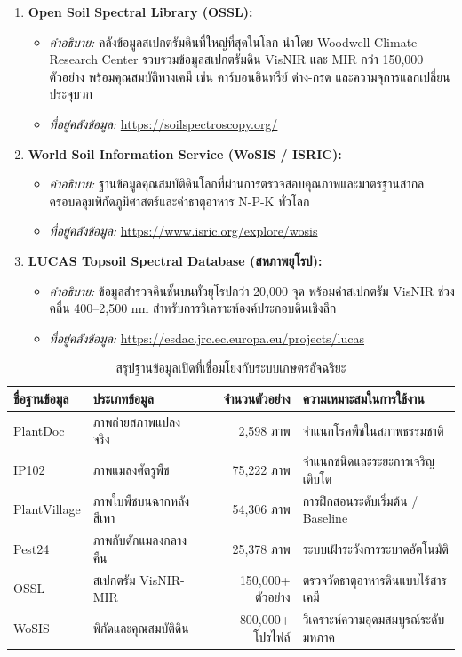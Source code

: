 \label{sec:soil_open_repos}

\begin{enumerate}
    \item \textbf{Open Soil Spectral Library (OSSL):}
    \begin{itemize}
        \item \textit{คำอธิบาย:} คลังข้อมูลสเปกตรัมดินที่ใหญ่ที่สุดในโลก นำโดย Woodwell Climate Research Center รวบรวมข้อมูลสเปกตรัมดิน VisNIR และ MIR กว่า 150,000 ตัวอย่าง พร้อมคุณสมบัติทางเคมี เช่น คาร์บอนอินทรีย์ ด่าง-กรด และความจุการแลกเปลี่ยนประจุบวก
        \item \textit{ที่อยู่คลังข้อมูล:} \url{https://soilspectroscopy.org/}
    \end{itemize}

    \item \textbf{World Soil Information Service (WoSIS / ISRIC):}
    \begin{itemize}
        \item \textit{คำอธิบาย:} ฐานข้อมูลคุณสมบัติดินโลกที่ผ่านการตรวจสอบคุณภาพและมาตรฐานสากล ครอบคลุมพิกัดภูมิศาสตร์และค่าธาตุอาหาร N-P-K ทั่วโลก
        \item \textit{ที่อยู่คลังข้อมูล:} \url{https://www.isric.org/explore/wosis}
    \end{itemize}

    \item \textbf{LUCAS Topsoil Spectral Database (สหภาพยุโรป):}
    \begin{itemize}
        \item \textit{คำอธิบาย:} ข้อมูลสำรวจดินชั้นบนทั่วยุโรปกว่า 20,000 จุด พร้อมค่าสเปกตรัม VisNIR ช่วงคลื่น 400--2,500 nm สำหรับการวิเคราะห์องค์ประกอบดินเชิงลึก
        \item \textit{ที่อยู่คลังข้อมูล:} \url{https://esdac.jrc.ec.europa.eu/projects/lucas}
    \end{itemize}
\end{enumerate}

\begin{table}[htbp]
\centering
\caption{สรุปฐานข้อมูลเปิดที่เชื่อมโยงกับระบบเกษตรอัจฉริยะ}
\label{tab:open_datasets_summary}
\begin{tabular}{llrl}
\toprule
\textbf{ชื่อฐานข้อมูล} & \textbf{ประเภทข้อมูล} & \textbf{จำนวนตัวอย่าง} & \textbf{ความเหมาะสมในการใช้งาน} \\
\midrule
PlantDoc    & ภาพถ่ายสภาพแปลงจริง & 2,598 ภาพ   & จำแนกโรคพืชในสภาพธรรมชาติ \\
IP102       & ภาพแมลงศัตรูพืช     & 75,222 ภาพ  & จำแนกชนิดและระยะการเจริญเติบโต \\
PlantVillage & ภาพใบพืชบนฉากหลังสีเทา & 54,306 ภาพ & การฝึกสอนระดับเริ่มต้น / Baseline \\
Pest24      & ภาพกับดักแมลงกลางคืน & 25,378 ภาพ & ระบบเฝ้าระวังการระบาดอัตโนมัติ \\
OSSL        & สเปกตรัม VisNIR-MIR & 150,000+ ตัวอย่าง & ตรวจวัดธาตุอาหารดินแบบไร้สารเคมี \\
WoSIS       & พิกัดและคุณสมบัติดิน & 800,000+ โปรไฟล์ & วิเคราะห์ความอุดมสมบูรณ์ระดับมหภาค \\
\bottomrule
\end{tabular}
\end{table}
